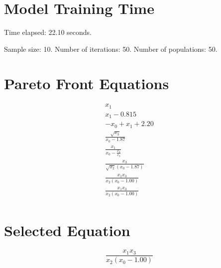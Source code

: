 \documentclass{article}
\begin{document}
\section*{Model Training Time}
Time elapsed: 22.10 seconds.

Sample size: 10.
Number of iterations: 50.
Number of populations: 50.

\section*{Pareto Front Equations}
\begin{align*}
x_{1} \\
x_{1} - 0.815 \\
- x_{0} + x_{1} + 2.20 \\
\frac{\sqrt{x_{3}}}{x_{0} - 1.87} \\
\frac{x_{1}}{x_{0} - \frac{x_{3}}{x_{2}}} \\
\frac{x_{3}}{\sqrt{x_{2}} \left(x_{0} - 1.87\right)} \\
\frac{x_{1} x_{3}}{x_{2} \left(x_{0} - 1.00\right)} \\
\frac{x_{1} x_{3}}{x_{2} \left(x_{0} - 1.00\right)} \\
\end{align*}

\section*{Selected Equation}
\[ \frac{x_{1} x_{3}}{x_{2} \left(x_{0} - 1.00\right)} \]
\end{document}
